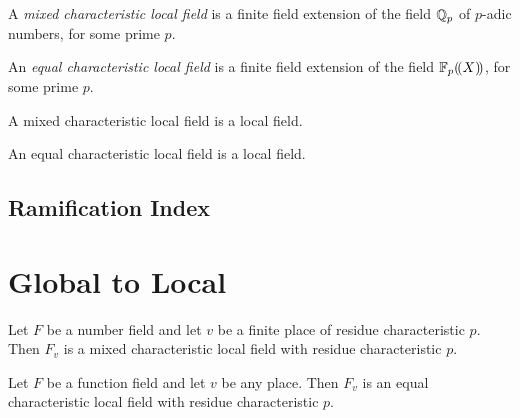 \begin{definition}
\label{mixed_char_local_field}
\leanok
A \textit{mixed characteristic local field} is a finite field extension of the field 
$\mathbb{Q}_{p}$ of $p$-adic numbers, for some prime $p$.
\end{definition}

\begin{definition}
\label{eq_char_local_field}
\leanok
An \textit{equal characteristic local field} is a finite field extension of the field 
${\mathbb{F}_{p}}(\!(X)\!)$, for some prime $p$.
\end{definition}

\begin{lemma}
\label{mixed_char_local_field.local_field}
A mixed characteristic local field is a local field.
\end{lemma}

\begin{lemma}
\label{eq_char_local_field.local_field}
An equal characteristic local field is a local field.
\end{lemma}
\subsection{Ramification Index}
\section{Global to Local}
\begin{proposition}
\label{prop:number_field_localization}
Let $F$ be a number field and let $v$ be a finite place of residue characteristic $p$. Then $F_v$ is a mixed characteristic local field with residue characteristic $p$.
\end{proposition}

\begin{proposition}
\label{prop:function_field_localization}
Let $F$ be a function field and let $v$ be any place. Then $F_v$ is an equal characteristic local field with residue characteristic $p$.
\end{proposition}
